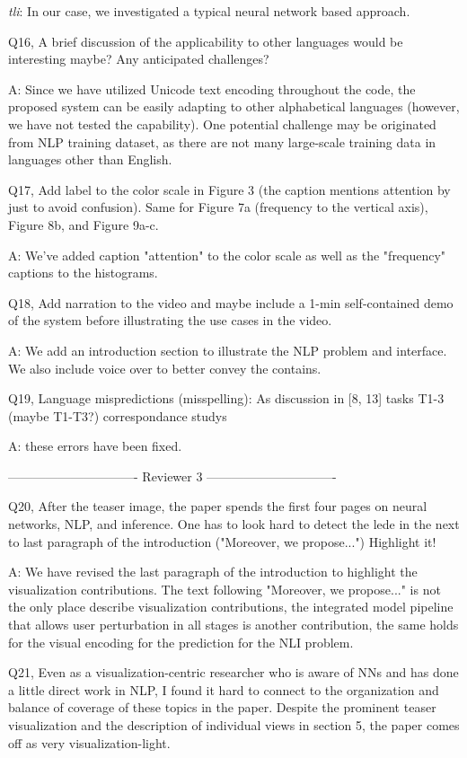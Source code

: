 \emph{tli}: In our case, we investigated a typical neural network based approach.

Q16, A brief discussion of the applicability to other languages would be interesting maybe? Any anticipated challenges?

A: Since we have utilized Unicode text encoding throughout the code, the proposed system can be easily adapting to other alphabetical languages (however, we have not tested the capability). One potential challenge may be originated from NLP training dataset, as there are not many large-scale training data in languages other than English.

Q17, Add label to the color scale in Figure 3 (the caption mentions attention by just to avoid confusion). Same for Figure 7a (frequency to the vertical axis), Figure 8b, and Figure 9a-c.

A: We've added caption "attention" to the color scale as well as the "frequency" captions to the histograms.

Q18, Add narration to the video and maybe include a 1-min self-contained demo of the system before illustrating the use cases in the video.

A: We add an introduction section to illustrate the NLP problem and interface. We also include voice over to better convey the contains.

Q19, Language mispredictions (misspelling):
As discussion in [8, 13]
tasks T1-3 (maybe T1-T3?)
correspondance
studys

A: these errors have been fixed.

------------------------------- Reviewer 3 -------------------------------

Q20, After the teaser image, the paper spends the first four pages on neural networks, NLP, and inference. One has to look hard to detect the lede in the next to last paragraph of the introduction ("Moreover, we propose...") Highlight it!

A: We have revised the last paragraph of the introduction to highlight the visualization contributions. The text following "Moreover, we propose..." is not the only place describe visualization contributions, the integrated model pipeline that allows user perturbation in all stages is another contribution, the same holds for the visual encoding for the prediction for the NLI problem.

Q21, Even as a visualization-centric researcher who is aware of NNs and has done a little direct work in NLP, I found it hard to connect to the organization and balance of coverage of these topics in the paper. Despite the prominent teaser visualization and the description of individual views in section 5, the paper comes off as very visualization-light.

